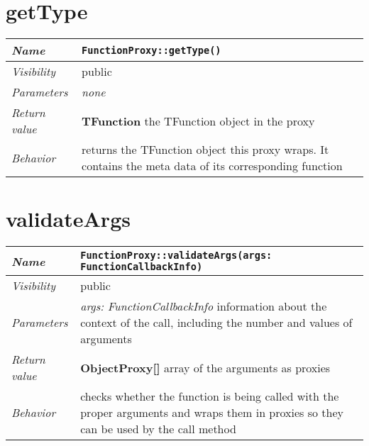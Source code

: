 \section{getType}
\begin{longtable}{p{3cm} @{\hskip 1cm} p{12cm}}
	\hline

	\textit{Name} & \texttt{FunctionProxy::getType()}\\
	\hline

	\textit{Visibility} & public\\
	\hline

	\textit{Parameters} & \textit{none}\\
	\hline

	\textit{Return value} & \textbf{TFunction} the TFunction object in the proxy \\
	\hline

	\textit{Behavior} & returns the TFunction object this proxy wraps. 
			It contains the meta data of its corresponding function \\
	\hline

\end{longtable} \pagebreak

\section{validateArgs}
\begin{longtable}{p{3cm} @{\hskip 1cm} p{12cm}}
	\hline

	\textit{Name} & \texttt{FunctionProxy::validateArgs(args: FunctionCallbackInfo)}\\
	\hline

	\textit{Visibility} & public\\
	\hline

	\textit{Parameters} & \textit{args: FunctionCallbackInfo} information about the context of the call, including the  number and values of arguments \\
	\hline

	\textit{Return value} & \textbf{ObjectProxy[]} array of the arguments as proxies\\
	\hline

	\textit{Behavior} & checks whether the function is being called with the proper arguments and wraps them in proxies so they can be used by the call method \\
	\hline

\end{longtable} \pagebreak

